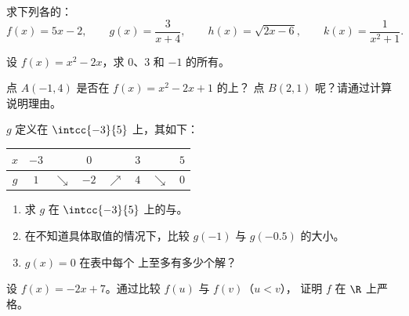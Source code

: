 \begin{exercise}[$\star$]\label{exo:g10:functions:2}
求下列各的：
\[
f(x) = 5x - 2, \qquad
g(x) = \frac{3}{x + 4}, \qquad
h(x) = \sqrt{2x - 6}, \qquad
k(x) = \frac{1}{x^2 + 1}.
\]
\end{exercise}

\begin{exercise}[$\star$]\label{exo:g10:functions:3}
设 $f(x) = x^2 - 2x$，求 $0$、$3$ 和 $-1$ 的所有。
\end{exercise}

\begin{exercise}[$\star$]\label{exo:g10:functions:4}
点 $A(-1, 4)$ 是否在 $f(x) = x^2 - 2x + 1$ 的上？
点 $B(2, 1)$ 呢？请通过计算说明理由。
\end{exercise}

\begin{exercise}[$\star$]\label{exo:g10:functions:5}
 $g$ 定义在 $\intcc{-3}{5}$ 上，其如下：
\begin{center}
\renewcommand{\arraystretch}{1.3}
\begin{tabular}{c|ccccccc}
$x$ & $-3$ & & $0$ & & $3$ & & $5$ \\
\hline
$g$ & $1$ & $\searrow$ & $-2$ & $\nearrow$ & $4$ & $\searrow$ & $0$ \\
\end{tabular}
\end{center}
\begin{enumerate}
  \item 求 $g$ 在 $\intcc{-3}{5}$ 上的与。
  \item 在不知道具体取值的情况下，比较 $g(-1)$ 与 $g(-0.5)$ 的大小。
  \item {} $g(x) = 0$ 在表中每个
        上至多有多少个解？
\end{enumerate}
\end{exercise}

\begin{exercise}[$\star\star$]\label{exo:g10:functions:6}
设 $f(x) = -2x + 7$。通过比较 $f(u)$ 与 $f(v)$（$u < v$），
证明 $f$ 在 $\R$ 上严格。
\end{exercise}

